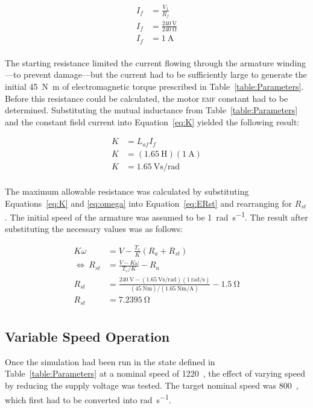 \documentclass[a4paper,10pt]{article}
\newcommand{\V}{\si{\volt}\xspace}
\newcommand{\A}{\si{\ampere}\xspace}
\newcommand{\Ohm}{\si{\ohm}\xspace}
\renewcommand{\H}{\si{\henry}\xspace}
\newcommand{\Nm}{\si{\newton\metre}\xspace}
\newcommand{\rps}{\si{\radian\per\second}\xspace}
\newcommand{\Vspr}{\si{\volt\second\per\radian}\xspace}
\newcommand{\NmpA}{\si{\newton\metre\per\ampere}\xspace}
\newcommand{\RPM}{\text{RPM}\xspace}
\newcommand{\EMF}{\textsc{emf}\xspace}
\begin{document}
\begin{align*}
    I_f &= \frac{V_f}{R_f} \\
    I_f &= \frac{240~\V}{240~\Ohm} \\
    I_f &= 1~\A \\
\end{align*}

The starting resistance limited the current flowing through the armature 
winding---to prevent damage---but the current had to be sufficiently large to 
generate the initial 45~\Nm of electromagnetic torque prescribed in 
Table~\ref{table:Parameters}. Before this resistance could be calculated, the 
motor \EMF constant had to be determined. Substituting the mutual inductance 
from Table~\ref{table:Parameters} and the constant field current into 
Equation~\ref{eq:K} yielded the following result:

\begin{align*}
    K &= L_{af} I_f \\
    K &= (1.65~\H) (1~\A) \\
    K &= 1.65~\Vspr \\
\end{align*}

The maximum allowable resistance was calculated by substituting 
Equations~\ref{eq:K} and \ref{eq:omega} into Equation~\ref{eq:ERst} and 
rearranging for $R_{st}$. The initial speed of the armature was assumed to be 
1~\rps. The result after substituting the necessary values was as follows:

\begin{align*}
    K \omega &= V - \frac{T_e}{K}(R_a + R_{st}) \\
    \Leftrightarrow~ R_{st} &= \frac{V - K\omega}{T_e/K} - R_a \\
    R_{st} &= \frac{240~\V - (1.65~\Vspr)(1~\rps)}{(45~\Nm)/(1.65~\NmpA)}
        - 1.5~\Ohm \\
    R_{st} &= 7.2395~\Ohm \\
\end{align*}

\subsection{Variable Speed Operation}

Once the simulation had been run in the state defined in 
Table~\ref{table:Parameters} at a nominal speed of 1220~\RPM, the effect of 
varying speed by reducing the supply voltage was tested. The target nominal 
speed was 800~\RPM, which first had to be converted into \rps.
\end{document}
